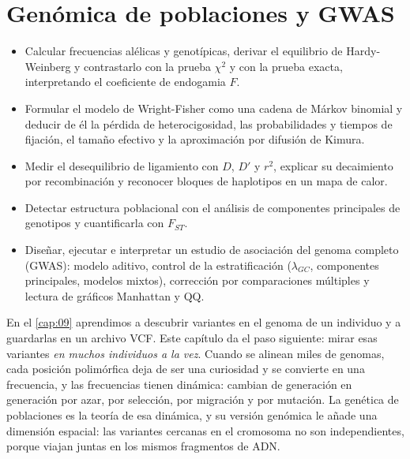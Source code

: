 \chapter{Genómica de poblaciones y GWAS}\label{cap:10}


\begin{objetivos}
\begin{itemize}
  \item Calcular frecuencias alélicas y genotípicas, derivar el equilibrio de Hardy-Weinberg y contrastarlo con la prueba $\chi^2$ y con la prueba exacta, interpretando el coeficiente de endogamia $F$.
  \item Formular el modelo de Wright-Fisher como una cadena de Márkov binomial y deducir de él la pérdida de heterocigosidad, las probabilidades y tiempos de fijación, el tamaño efectivo y la aproximación por difusión de Kimura.
  \item Medir el desequilibrio de ligamiento con $D$, $D'$ y $r^2$, explicar su decaimiento por recombinación y reconocer bloques de haplotipos en un mapa de calor.
  \item Detectar estructura poblacional con el análisis de componentes principales de genotipos y cuantificarla con $F_{ST}$.
  \item Diseñar, ejecutar e interpretar un estudio de asociación del genoma completo (GWAS): modelo aditivo, control de la estratificación ($\lambda_{GC}$, componentes principales, modelos mixtos), corrección por comparaciones múltiples y lectura de gráficos Manhattan y QQ.
\end{itemize}
\end{objetivos}

En el \cref{cap:09} aprendimos a descubrir variantes en el genoma de un individuo y a guardarlas en un archivo VCF. Este capítulo da el paso siguiente: mirar esas variantes \emph{en muchos individuos a la vez}. Cuando se alinean miles de genomas, cada posición polimórfica deja de ser una curiosidad y se convierte en una frecuencia, y las frecuencias tienen dinámica: cambian de generación en generación por azar, por selección, por migración y por mutación. La genética de poblaciones es la teoría de esa dinámica, y su versión genómica le añade una dimensión espacial: las variantes cercanas en el cromosoma no son independientes, porque viajan juntas en los mismos fragmentos de ADN.

